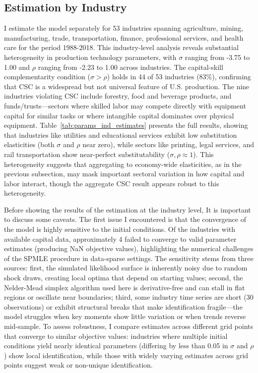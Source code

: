\documentclass[12pt]{article}
\begin{document}
\subsection{Estimation by Industry}

I estimate the model separately for 53 industries spanning agriculture, mining, manufacturing, trade, transportation, finance, professional services, and health care for the period 1988-2018. This industry-level analysis reveals substantial heterogeneity in production technology parameters, with $\sigma$ ranging from -3.75 to 1.00 and $\rho$ ranging from -2.23 to 1.00 across industries. The capital-skill complementarity condition ($\sigma > \rho$) holds in 44 of 53 industries (83\%), confirming that CSC is a widespread but not universal feature of U.S. production. The nine industries violating CSC include forestry, food and beverage products, and funds/trusts---sectors where skilled labor may compete directly with equipment capital for similar tasks or where intangible capital dominates over physical equipment. Table~\ref{tab:params_ind_estimates} presents the full results, showing that industries like utilities and educational services exhibit low substitution elasticities (both $\sigma$ and $\rho$ near zero), while sectors like printing, legal services, and rail transportation show near-perfect substitutability ($\sigma, \rho \approx 1$). This heterogeneity suggests that aggregating to economy-wide elasticities, as in the previous subsection, may mask important sectoral variation in how capital and labor interact, though the aggregate CSC result appears robust to this heterogeneity.

Before showing the results of the estimation at the industry level, It is important to discuss some caveats. The first issue I encountered is that the convergence of the model is highly sensitive to the initial conditions. Of the industries with available capital data, approximately 4 failed to converge to valid parameter estimates (producing NaN objective values), highlighting the numerical challenges of the SPMLE procedure in data-sparse settings. The sensitivity stems from three sources: first, the simulated likelihood surface is inherently noisy due to random shock draws, creating local optima that depend on starting values; second, the Nelder-Mead simplex algorithm used here is derivative-free and can stall in flat regions or oscillate near boundaries; third, some industry time series are short (30 observations) or exhibit structural breaks that make identification fragile---the model struggles when key moments show little variation or when trends reverse mid-sample. To assess robustness, I compare estimates across different grid points that converge to similar objective values: industries where multiple initial conditions yield nearly identical parameters (differing by less than 0.05 in $\sigma$ and $\rho$) show local identification, while those with widely varying estimates across grid points suggest weak or non-unique identification.
\end{document}
